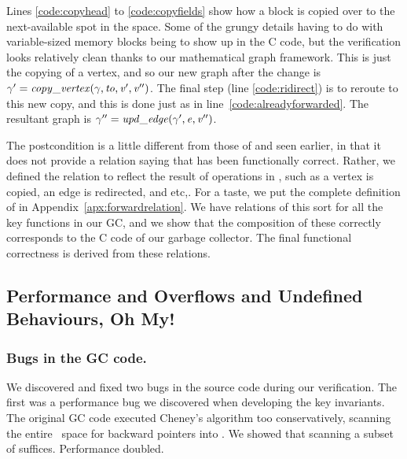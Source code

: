 Lines \ref{code:copyhead} to \ref{code:copyfields} show
how a block is copied over to the next-available spot in the 
 space. Some of the grungy details having to do with
variable-sized memory blocks being to show up in the C code,
but the verification looks relatively clean 
thanks to our mathematical graph framework.
This is just the copying of a vertex, and so our new graph after the change is
$\gamma' = \mathit{copy\_vertex}(\gamma, \mathit{to}, \mathit{v'}, \mathit{v''})$. 
The final step (line \ref{code:ridirect}) is to reroute to this 
new copy, and this is done just as in line~\ref{code:alreadyforwarded}. The
resultant graph is $\gamma'' = \mathit{upd\_edge}(\gamma', \mathit{e}, \mathit{v''})$.

The postcondition is a little different from those of 
and  seen earlier, in that it does not provide a relation
saying that  has been functionally correct. Rather, we
defined the relation to reflect the result of operations
in , such as a vertex is copied, an edge is redirected,
and etc,. For a taste, we put the complete definition
of  in Appendix~\ref{apx:forwardrelation}. We
have relations of this sort for all the key functions in our GC, and
we show that the composition of these correctly corresponds to the C
code of our garbage collector. The final functional correctness is
derived from these relations.



\subsection{Performance and Overflows and Undefined Behaviours, Oh My!} \label{sec:gcissues}

\subsubsection*{Bugs in the GC code.}
We discovered and fixed two bugs in the source code during our verification.
The first was a performance bug we discovered when developing the key invariants.
The original GC code executed Cheney's algorithm too conservatively,
scanning the entire~ space for backward pointers into . We
showed that scanning a subset of  suffices.  Performance doubled.

